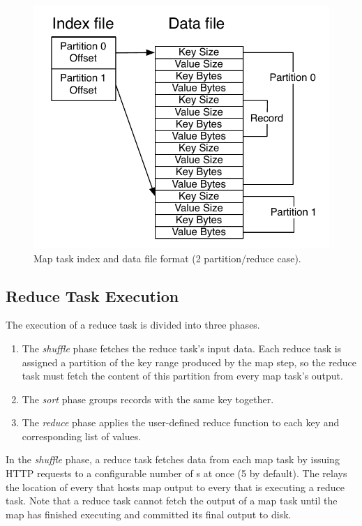 \begin{figure}[t]
  \ssp
  \centering
  \includegraphics[scale=0.8]{figures/spill_file.pdf}
  \caption{Map task index and data file format (2 partition/reduce case).}
  \label{ch:hadoop:fig:mapoutput}
\end{figure}

\subsection{Reduce Task Execution}
\label{ch:hadoop:sec:reducetask}
The execution of a reduce task is divided into three phases.
\begin{enumerate}
\item The \emph{shuffle} phase fetches the reduce task's input
  data. Each reduce task is assigned a partition of the key range
  produced by the map step, so the reduce task must fetch the content
  of this partition from every map task's output.
\item The \emph{sort} phase groups records with the same key together.
\item The \emph{reduce} phase applies the user-defined reduce function
  to each key and corresponding list of values.
\end{enumerate}

In the \emph{shuffle} phase, a reduce task fetches data from each map task by
issuing HTTP requests to a configurable number of {\TT}s at once (5 by
default). The {\JT} relays the location of every {\TT} that hosts map output to
every {\TT} that is executing a reduce task. Note that a reduce task cannot
fetch the output of a map task until the map has finished executing and
committed its final output to disk.

